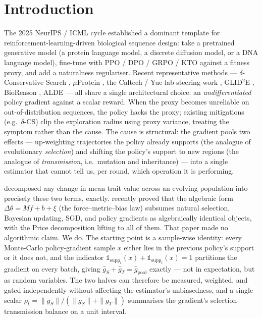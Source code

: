 \section{Introduction}
\label{sec:introduction}

The 2025 NeurIPS / ICML cycle established a dominant template for reinforcement-learning-driven biological sequence design: take a pretrained generative model (a protein language model, a discrete diffusion model, or a DNA language model), fine-tune with PPO / DPO / GRPO / KTO against a fitness proxy, and add a naturalness regulariser. Recent representative methods --- $\delta$-Conservative Search \citep{kim2025deltacs}, $\mu$Protein \citep{sun2025muprotein}, the Caltech / Yue-lab steering work \citep{yang2025steering}, GLID$^2$E \citep{cao2025glid2e}, BioReason \citep{bioreason2025}, ALDE \citep{yang2025alde} --- all share a single architectural choice: an \emph{undifferentiated} policy gradient against a scalar reward. When the proxy becomes unreliable on out-of-distribution sequences, the policy hacks the proxy; existing mitigations (e.g.\ $\delta$-CS) clip the exploration radius using proxy variance, treating the symptom rather than the cause. The cause is structural: the gradient pools two effects --- up-weighting trajectories the policy already supports (the analogue of evolutionary \emph{selection}) and shifting the policy's support to new regions (the analogue of \emph{transmission}, i.e.\ mutation and inheritance) --- into a single estimator that cannot tell us, per round, which operation it is performing.

\citet{price1970selection} decomposed any change in mean trait value across an evolving population into precisely these two terms, exactly. \citet{frank2025price} recently proved that the algebraic form $\Delta\theta = M f + b + \xi$ (the force--metric--bias law) subsumes natural selection, Bayesian updating, SGD, and policy gradients as algebraically identical objects, with the Price decomposition lifting to all of them. That paper made no algorithmic claim. We do. The starting point is a sample-wise identity: every Monte-Carlo policy-gradient sample $x$ either lies in the previous policy's support or it does not, and the indicator $\mathbb{1}_{\mathrm{supp}_t}(x) + \mathbb{1}_{\overline{\mathrm{supp}}_t}(x) = 1$ partitions the gradient on every batch, giving $\hat g_S + \hat g_T = \hat g_{\mathrm{pool}}$ exactly --- not in expectation, but as random variables. The two halves can therefore be measured, weighted, and gated independently without affecting the estimator's unbiasedness, and a single scalar $\rho_t = \|g_S\|/(\|g_S\|+\|g_T\|)$ summarises the gradient's selection--transmission balance on a unit interval.

